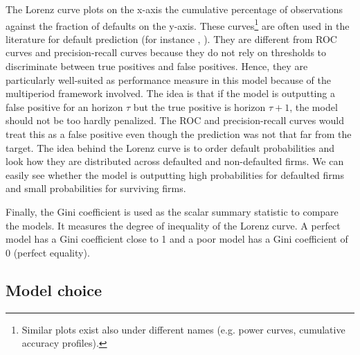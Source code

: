 The Lorenz curve plots on the x-axis the cumulative percentage of observations against the fraction of defaults on the y-axis.
These curves\footnote{Similar plots exist also under different names (e.g. power curves, cumulative accuracy profiles).} are often used in the literature for default prediction (for instance \citet{leippold}, \citet{Duan2012}). They are different from ROC curves and precision-recall curves because they do not rely on thresholds to discriminate between true positives and false positives. Hence, they are particularly well-suited as performance measure in this model because of the multiperiod framework involved. The idea is that if the model is outputting a false positive for an horizon $\tau$ but the true positive is horizon $\tau+1$, the model should not be too hardly penalized. The ROC and precision-recall curves would treat this as a false positive even though the prediction was not that far from the target. The idea behind the Lorenz curve is to order default probabilities and look how they are distributed across defaulted and non-defaulted firms. We can easily see whether the model is outputting high probabilities for defaulted firms and small probabilities for surviving firms. 

Finally, the Gini coefficient is used as the scalar summary statistic to compare the models. It measures the degree of inequality of the Lorenz curve. A perfect model has a Gini coefficient close to 1 and a poor model has a Gini coefficient of 0 (perfect equality).

\subsection{Model choice}
\label{sec4-1}

